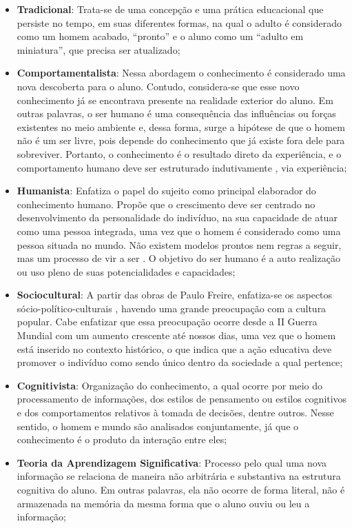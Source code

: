 \begin{itemize}
    \item \textbf{Tradicional}: Trata-se de uma concepção e uma prática educacional que persiste no tempo, em suas diferentes formas, na qual o adulto é considerado como um homem acabado, ``pronto'' e o aluno como um ``adulto em miniatura'', que precisa ser atualizado;
    \item \textbf{Comportamentalista}: Nessa abordagem o conhecimento é considerado uma nova descoberta para o aluno. Contudo, considera-se que esse novo conhecimento já se encontrava presente na realidade exterior do aluno. Em outras palavras, o ser humano é uma consequência das influências ou forças existentes no meio ambiente e, dessa forma, surge a hipótese de que o homem não é um ser livre, pois depende do conhecimento que já existe fora dele para sobreviver. Portanto, o conhecimento é o resultado direto da experiência, e o comportamento humano deve ser estruturado indutivamente , via experiência;
    \item \textbf{Humanista}: Enfatiza o papel do sujeito como principal elaborador do conhecimento humano. Propõe que o crescimento deve ser centrado no desenvolvimento da personalidade do indivíduo, na sua capacidade de atuar como uma pessoa integrada, uma vez que o homem é considerado como uma pessoa situada no mundo. Não existem modelos prontos nem regras a seguir, mas um processo de vir a ser . O objetivo do ser humano é a auto realização ou uso pleno de suas potencialidades e capacidades;
    \item \textbf{Sociocultural}: A partir das obras de Paulo Freire, enfatiza-se os aspectos sócio-político-culturais , havendo uma grande preocupação com a cultura popular. Cabe enfatizar que essa preocupação ocorre desde a II Guerra Mundial com um aumento crescente até nossos dias, uma vez que o homem está inserido no contexto histórico, o que indica que a ação educativa deve promover o indivíduo como sendo único dentro da sociedade a qual pertence;
    \item \textbf{Cognitivista}: Organização do conhecimento, a qual ocorre por meio do processamento de informações, dos estilos de pensamento ou estilos cognitivos e dos comportamentos relativos à tomada de decisões, dentre outros. Nesse sentido, o homem e mundo são analisados conjuntamente, já que o conhecimento é o produto da interação entre eles;
    \item \textbf{Teoria da Aprendizagem Significativa}: Processo pelo qual uma nova informação se relaciona de maneira não arbitrária e substantiva na estrutura cognitiva do aluno. Em outras palavras, ela não ocorre de forma literal, não é armazenada na memória da mesma forma que o aluno ouviu ou leu a informação;

\end{itemize}
